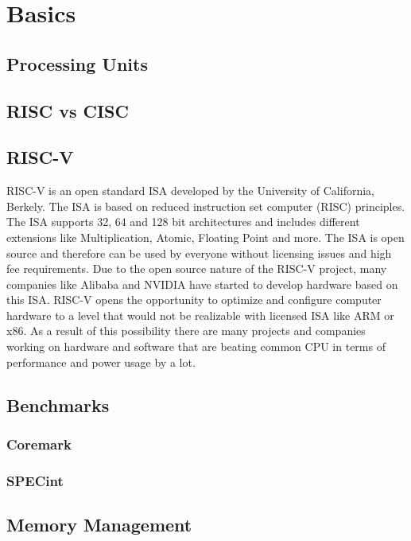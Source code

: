 
\chapter{Basics}
\section{Processing Units}
\section{RISC vs CISC}
\section{RISC-V}
RISC-V is an open standard \acf{ISA} developed by the
University of California, Berkely. The ISA is based on reduced instruction set
computer (RISC) principles. The ISA supports 32, 64 and 128 bit architectures and
includes different extensions like Multiplication, Atomic, Floating Point and more. The
ISA is open source and therefore can be used by everyone without licensing issues
and high fee requirements. Due to the open source nature of the RISC-V project,
many companies like Alibaba and NVIDIA have started to develop hardware based
on this ISA.
RISC-V opens the opportunity to optimize and configure computer hardware to a
level that would not be realizable with licensed ISA like ARM or x86. As a result of
this possibility there are many projects and companies working on hardware and
software that are beating common CPU in terms of performance and power usage
by a lot.

\section{Benchmarks}
\subsection{Coremark}
\subsection{SPECint}
\section{Memory Management}
